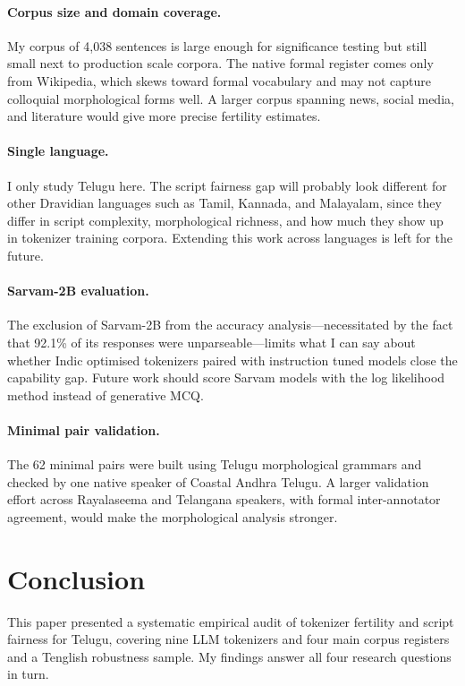 ﻿\documentclass[11pt]{article}
\begin{document}
\paragraph{Corpus size and domain coverage.}
My corpus of 4,038 sentences is large enough for significance
testing but still small next to production scale corpora. The
native formal register comes only from Wikipedia, which skews
toward formal vocabulary and may not capture colloquial
morphological forms well. A larger corpus spanning news, social
media, and literature would give more precise fertility estimates.

\paragraph{Single language.}
I only study Telugu here. The script fairness gap will probably
look different for other Dravidian languages such as Tamil, Kannada,
and Malayalam, since they differ in script complexity, morphological
richness, and how much they show up in tokenizer training corpora.
Extending this work across languages is left for the future.

\paragraph{Sarvam-2B evaluation.}
The exclusion of Sarvam-2B from the accuracy analysis---necessitated
by the fact that 92.1\% of its responses were unparseable---limits
what I can say about whether Indic optimised tokenizers paired with
instruction tuned models close the capability gap. Future work should score Sarvam models
with the log likelihood method instead of generative MCQ.

\paragraph{Minimal pair validation.}
The 62 minimal pairs were built using Telugu morphological grammars
and checked by one native speaker of Coastal Andhra Telugu. A larger
validation effort across Rayalaseema and Telangana speakers, with
formal inter-annotator agreement, would make the morphological
analysis stronger.


\section{Conclusion}
\label{sec:conclusion}
This paper presented a systematic empirical audit of tokenizer
fertility and script fairness for Telugu, covering nine LLM
tokenizers and four main corpus registers and a Tenglish robustness sample. My findings answer all
four research questions in turn.
\end{document}
